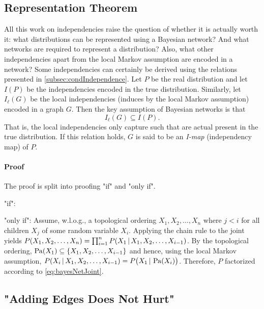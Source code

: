 		\subsection{Representation Theorem}
			All this work on independencies raise the question of whether it is actually worth it: what distributions can be represented using a Bayesian network? And what networks are required to represent a distribution? Also, what other independencies apart from the local Markov assumption are encoded in a network? Some independencies can certainly be derived using the relations presented in \autoref{subsec:condIndependence}. Let \(P\) be the real distribution and let \( I(P) \) be the independencies encoded in the true distribution. Similarly, let \( I_\ell(G) \) be the local independencies (induces by the local Markov assumption) encoded in a graph \(G\). Then the key assumption of Bayesian networks is that
			\begin{equation}
				I_\ell(G) \subseteq I(P).
			\end{equation}
			That is, the local independencies only capture such that are actual present in the true distribution. If this relation holds, \(G\) is said to be an \emph{I-map} (independency map) of \(P\).


			\paragraph{Proof} %
				The proof is split into proofing "if" and "only if".

				"if": 

				"only if": Assume, w.l.o.g., a topological ordering \( X_1, X_2, \dots, X_n \) where \(j < i\) for all children \(X_j\) of some random variable \(X_i\). Applying the chain rule to the joint yields \( P(X_1, X_2, \dots, X_n) = \prod_{i = 1}^{n} P(X_1 \,\vert\, X_1, X_2, \dots, X_{i - 1}) \). By the topological ordering, \( \operatorname{Pa}(X_1) \subseteq \{ X_1, X_2, \dots, X_{i - 1} \} \) and hence, using the local Markov assumption, \( P(X_i \,\vert\, X_1, X_2, \dots, X_{i - 1}) = P\bigl(X_1 \,\vert\, \operatorname{Pa}(X_i) \bigr) \). Therefore, \(P\) factorized according to \eqref{eq:bayesNetJoint}.

		\subsection{"Adding Edges Does Not Hurt"}

